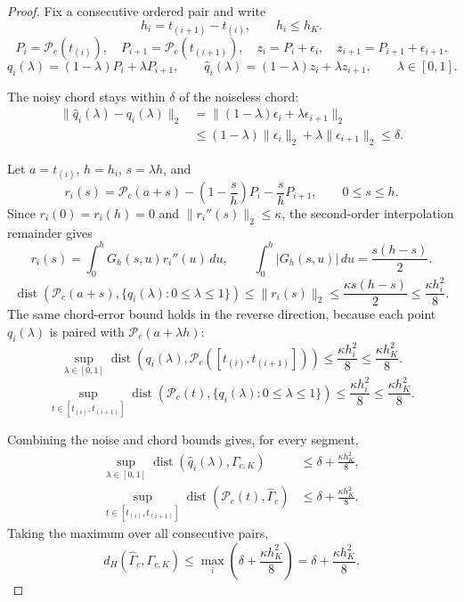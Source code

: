 \documentclass[preprint,12pt,number]{elsarticle}
\begin{document}
\begin{proof}
	Fix a consecutive ordered pair and write
	\[
	h_i=t_{(i+1)}-t_{(i)},\qquad h_i\le h_K.
	\]
	\[
	P_i=\mathcal{P}_c(t_{(i)}),\quad
	P_{i+1}=\mathcal{P}_c(t_{(i+1)}),\quad
	z_i=P_i+\epsilon_i,\quad
	z_{i+1}=P_{i+1}+\epsilon_{i+1}.
	\]
	\[
	q_i(\lambda)=(1-\lambda)P_i+\lambda P_{i+1},
	\qquad
	\hat q_i(\lambda)=(1-\lambda)z_i+\lambda z_{i+1},
	\qquad
	\lambda\in[0,1].
	\]

	The noisy chord stays within $\delta$ of the noiseless chord:
	\[
	\begin{aligned}
	\lVert \hat q_i(\lambda)-q_i(\lambda)\rVert_2
	&=
	\lVert(1-\lambda)\epsilon_i+\lambda\epsilon_{i+1}\rVert_2\\
	&\le
	(1-\lambda)\lVert\epsilon_i\rVert_2+\lambda\lVert\epsilon_{i+1}\rVert_2
	\le
	\delta .
	\end{aligned}
	\]

	Let $a=t_{(i)}$, $h=h_i$, $s=\lambda h$, and
	\[
	r_i(s)=\mathcal{P}_c(a+s)-\left(1-\frac{s}{h}\right)P_i-\frac{s}{h}P_{i+1},
	\qquad 0\le s\le h .
	\]
	Since $r_i(0)=r_i(h)=0$ and $\lVert r_i''(s)\rVert_2\le\kappa$, the second-order interpolation remainder gives
	\[
	r_i(s)=\int_0^hG_h(s,u)r_i''(u)\,du,
	\qquad
	\int_0^h|G_h(s,u)|\,du=\frac{s(h-s)}{2}.
	\]
	\[
	\operatorname{dist}\!\left(\mathcal{P}_c(a+s),\{q_i(\lambda):0\le\lambda\le1\}\right)
	\le
	\lVert r_i(s)\rVert_2
	\le
	\frac{\kappa s(h-s)}{2}
	\le
	\frac{\kappa h_i^2}{8}.
	\]
	The same chord-error bound holds in the reverse direction, because each point $q_i(\lambda)$ is paired with $\mathcal{P}_c(a+\lambda h)$:
	\[
	\sup_{\lambda\in[0,1]}
	\operatorname{dist}\!\left(q_i(\lambda),\mathcal{P}_c([t_{(i)},t_{(i+1)}])\right)
	\le
	\frac{\kappa h_i^2}{8}
	\le
	\frac{\kappa h_K^2}{8}.
	\]
	\[
	\sup_{t\in[t_{(i)},t_{(i+1)}]}
	\operatorname{dist}\!\left(\mathcal{P}_c(t),\{q_i(\lambda):0\le\lambda\le1\}\right)
	\le
	\frac{\kappa h_i^2}{8}
	\le
	\frac{\kappa h_K^2}{8}.
	\]

	Combining the noise and chord bounds gives, for every segment,
	\[
	\begin{aligned}
	\sup_{\lambda\in[0,1]}
	\operatorname{dist}(\hat q_i(\lambda),\Gamma_{c,K})
	&\le
	\delta+\frac{\kappa h_K^2}{8},\\
	\sup_{t\in[t_{(i)},t_{(i+1)}]}
	\operatorname{dist}(\mathcal{P}_c(t),\widehat{\Gamma}_c)
	&\le
	\delta+\frac{\kappa h_K^2}{8}.
	\end{aligned}
	\]
	Taking the maximum over all consecutive pairs,
	\[
	d_H(\widehat{\Gamma}_c,\Gamma_{c,K})
	\le
	\max_i\left(\delta+\frac{\kappa h_K^2}{8}\right)
	=
	\delta+\frac{\kappa h_K^2}{8}.
	\]
\end{proof}
\end{document}
